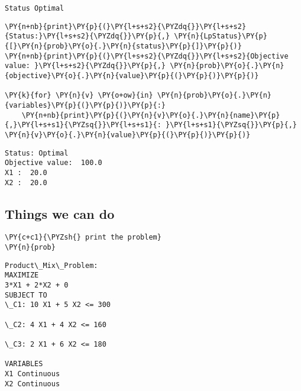     \begin{Verbatim}[commandchars=\\\{\}]
Status Optimal
    \end{Verbatim}

    \begin{tcolorbox}[breakable, size=fbox, boxrule=1pt, pad at break*=1mm,colback=cellbackground, colframe=cellborder]
\begin{Verbatim}[commandchars=\\\{\}]
\PY{n+nb}{print}\PY{p}{(}\PY{l+s+s2}{\PYZdq{}}\PY{l+s+s2}{Status:}\PY{l+s+s2}{\PYZdq{}}\PY{p}{,} \PY{n}{LpStatus}\PY{p}{[}\PY{n}{prob}\PY{o}{.}\PY{n}{status}\PY{p}{]}\PY{p}{)}
\PY{n+nb}{print}\PY{p}{(}\PY{l+s+s2}{\PYZdq{}}\PY{l+s+s2}{Objective value: }\PY{l+s+s2}{\PYZdq{}}\PY{p}{,} \PY{n}{prob}\PY{o}{.}\PY{n}{objective}\PY{o}{.}\PY{n}{value}\PY{p}{(}\PY{p}{)}\PY{p}{)}

\PY{k}{for} \PY{n}{v} \PY{o+ow}{in} \PY{n}{prob}\PY{o}{.}\PY{n}{variables}\PY{p}{(}\PY{p}{)}\PY{p}{:}
    \PY{n+nb}{print}\PY{p}{(}\PY{n}{v}\PY{o}{.}\PY{n}{name}\PY{p}{,}\PY{l+s+s1}{\PYZsq{}}\PY{l+s+s1}{: }\PY{l+s+s1}{\PYZsq{}}\PY{p}{,} \PY{n}{v}\PY{o}{.}\PY{n}{value}\PY{p}{(}\PY{p}{)}\PY{p}{)}
\end{Verbatim}
\end{tcolorbox}

    \begin{Verbatim}[commandchars=\\\{\}]
Status: Optimal
Objective value:  100.0
X1 :  20.0
X2 :  20.0
    \end{Verbatim}

    \hypertarget{things-we-can-do}{%
\subsection{Things we can do}\label{things-we-can-do}}

    \begin{tcolorbox}[breakable, size=fbox, boxrule=1pt, pad at break*=1mm,colback=cellbackground, colframe=cellborder]
\begin{Verbatim}[commandchars=\\\{\}]
\PY{c+c1}{\PYZsh{} print the problem}
\PY{n}{prob}
\end{Verbatim}
\end{tcolorbox}

            \begin{tcolorbox}[breakable, size=fbox, boxrule=.5pt, pad at break*=1mm, opacityfill=0]
\begin{Verbatim}[commandchars=\\\{\}]
Product\_Mix\_Problem:
MAXIMIZE
3*X1 + 2*X2 + 0
SUBJECT TO
\_C1: 10 X1 + 5 X2 <= 300

\_C2: 4 X1 + 4 X2 <= 160

\_C3: 2 X1 + 6 X2 <= 180

VARIABLES
X1 Continuous
X2 Continuous
\end{Verbatim}
\end{tcolorbox}
        
